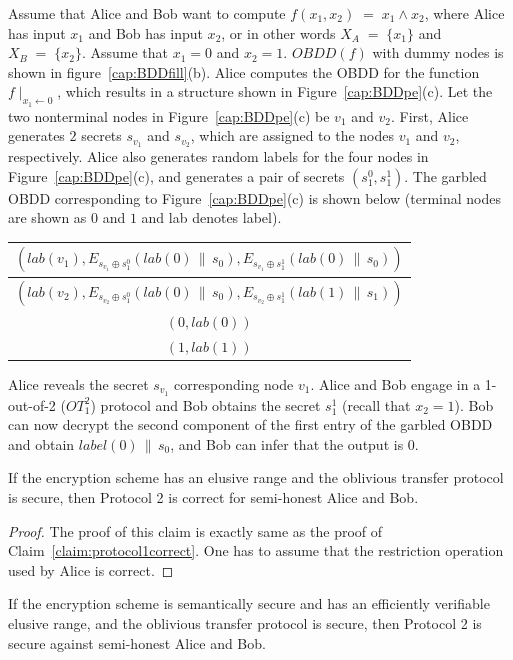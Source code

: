 \begin{example}
\label{example:protocol2}
\rm Assume that Alice and Bob want to compute $f(x_1,x_2)  \; = \; x_1 \wedge x_2$, where
Alice has input $x_1$ and Bob has input $x_2$, or in other words $X_A
\; = \; \{ x_1 \}$ and $X_B \; = \; \{ x_2 \}$.  Assume that $x_1 = 0$
and $x_2 = 1$. $OBDD(f)$ with dummy nodes is shown in
figure~\ref{cap:BDDfill}(b). Alice computes the OBDD for the function
$f \mid_{ x_1 \leftarrow 0}$, which results in a structure shown in
Figure~\ref{cap:BDDpe}(c).  Let the two nonterminal nodes in
Figure~\ref{cap:BDDpe}(c) be $v_1$ and $v_2$. First, Alice generates
$2$ secrets $s_{v_1}$ and  $s_{v_2}$, which are assigned
to the nodes $v_1$ and $v_2$, respectively.   Alice also
generates random labels for the four nodes in
Figure~\ref{cap:BDDpe}(c), and  generates a pair of secrets
$(s_1^0,s_1^1)$. The garbled OBDD corresponding to
Figure~\ref{cap:BDDpe}(c) is shown below (terminal nodes
are shown as $0$ and $1$ and lab denotes label). 
\begin{center}
\begin{tabular}{|c|} \hline
$(lab(v_1), E_{s_{v_1} \oplus s_1^0} (lab(0)  \,\|\, s_0), E_{s_{v_1} \oplus s_1^1} (lab(0) \,\|\, s_0))$ \\ \hline
$(lab(v_2), E_{s_{v_2} \oplus s_1^0} (lab(0) \,\|\, s_0), E_{s_{v_2} \oplus s_1^1} (lab(1) \,\|\, s_1))$ \\ \hline
$(0,lab(0))$ \\ \hline
$(1,lab(1))$ \\ \hline
\end{tabular}
\end{center}
Alice reveals the secret $s_{v_1}$ corresponding node $v_1$.
Alice and Bob engage in a 1-out-of-2 ($OT^2_1$) protocol and Bob obtains the secret $s_1^1$ (recall that
$x_2 = 1$).
Bob can now decrypt the second component of the first entry of the garbled OBDD and
obtain $label(0) \,\|\, s_0$, and  Bob can infer that the output is $0$.
\end{example}

\begin{claim} If the encryption scheme has an elusive range and the
oblivious transfer protocol is secure, then Protocol 2 is correct for
semi-honest Alice and Bob.
\label{claim:protocol2correct}
\end{claim}
\begin{proof}
The proof of this claim is exactly same as the proof of Claim~\ref{claim:protocol1correct}.
One has to assume that the restriction operation used by Alice is correct.
\end{proof}

\begin{claim} If the encryption scheme is semantically secure and has an
efficiently verifiable elusive range, and the oblivious transfer
protocol is secure, then Protocol 2 is secure against semi-honest
Alice and Bob.
\label{claim:protocol2secure}
\end{claim}

